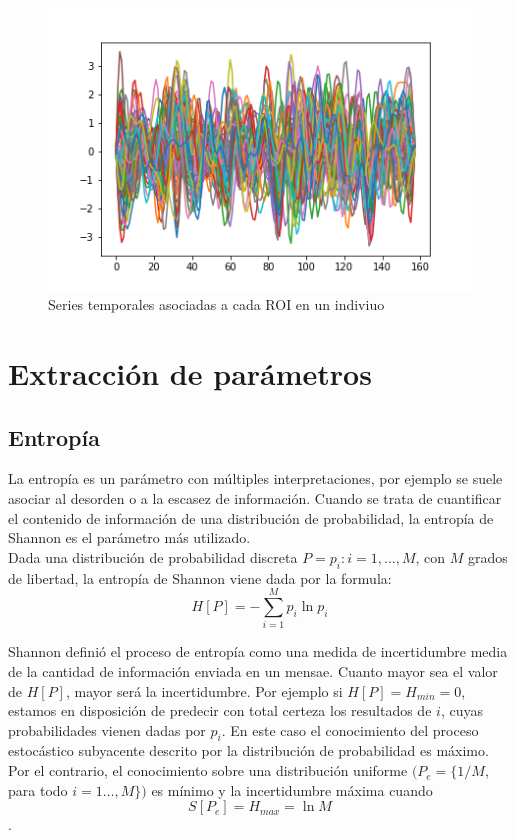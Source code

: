 \begin{figure}[H]
	\includegraphics[width=\linewidth, height=\textheight, keepaspectratio]{img/conectividad/ts.png}
	\caption{Series temporales asociadas a cada ROI en un indiviuo}	\label{metod:ts}
\end{figure}


\section{Extracción de parámetros}

\subsection{Entropía}

La entropía es un parámetro con múltiples interpretaciones, por ejemplo se suele asociar al desorden o a la escasez de información. Cuando se trata de cuantificar el contenido de información de una distribución de probabilidad, la entropía de Shannon es el parámetro más utilizado.\\

Dada una distribución de probabilidad discreta $P={p_{i}:i=1,\dots,M}$, con $M$ grados de libertad, la entropía de Shannon viene dada por la formula:$$H[P]=-\sum_{i=1}^{M}{p_{i}\ln{p_{i}}}$$

Shannon definió el proceso de entropía como una medida de incertidumbre media de la cantidad de información enviada en un mensae. Cuanto mayor sea el valor de $H[P]$, mayor será la incertidumbre. Por ejemplo si $H[P]= H_{min} =0$, estamos en disposición de predecir con total certeza los resultados de $i$, cuyas probabilidades vienen dadas por $p_{i}$. En este caso el conocimiento del proceso estocástico subyacente descrito por la distribución de probabilidad es máximo. Por el contrario, el conocimiento sobre una distribución uniforme $(P_{e}=\{1/M$, para todo $i=1\dots,M\})$ es mínimo y la incertidumbre máxima cuando 
$$S[P_{e}]=H_{max}=\ln{M}$$ \cite{shannontc}.

